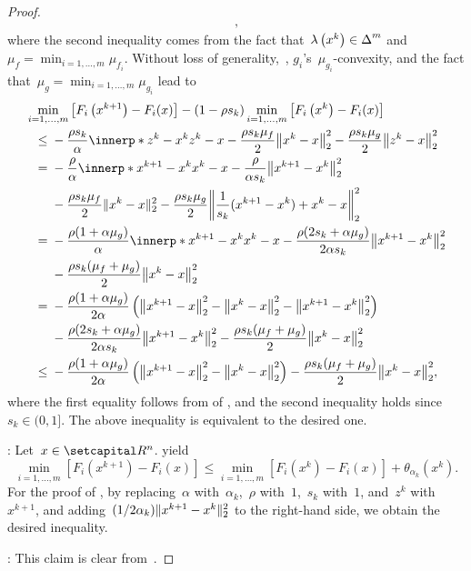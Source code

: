 \documentclass[../../main]{subfiles}
\begin{document}
\begin{proof}
\begin{align}
    ,\end{align} 
    where the second inequality comes from the fact that~$\lambda\left(x^k\right) \in \operatorname{\Delta}^m$ and~$\mu_f = \min_{i = 1, \dots, m} \mu_{f_i}$.
    Without loss of generality,~, $g_i$'s~$\mu_{g_i}$-convexity, and the fact that~$\mu_g = \min_{i = 1, \dots, m} \mu_{g_i}$ lead to
    \begin{align}
        \MoveEqLeft \min_{i = 1, \dots, m} \left[F_i\left(x^{k + 1}\right) - F_i(x)\right] - (1 - \rho s_k) \min_{i = 1, \dots, m} \left[F_i\left(x^k\right) - F_i(x)\right] \\
        \le{}& - \frac{\rho s_k}{\alpha} \innerp*{z^k - x^k}{z^k - x} - \frac{\rho s_k \mu_f}{2} \norm*{x^k - x}_2^2 - \frac{\rho s_k \mu_g}{2} \norm*{z^k - x}_2^2 \\
        ={}& - \frac{\rho}{\alpha} \innerp*{x^{k + 1} - x^k}{x^k - x} - \frac{\rho}{\alpha s_k} \norm*{x^{k + 1} - x^k}_2^2 \\
             &- \frac{\rho s_k \mu_f}{2} \norm{x^k - x}_2^2 - \frac{\rho s_k \mu_g}{2} \norm*{\frac{1}{s_k} (x^{k + 1} - x^k) + x^k - x}_2^2 \\
        ={}& - \frac{\rho (1 + \alpha \mu_g)}{\alpha} \innerp*{x^{k + 1} - x^k}{x^k - x} - \frac{\rho (2 s_k + \alpha \mu_g)}{2 \alpha s_k} \norm*{x^{k + 1} - x^k}_2^2  \\
             &- \frac{\rho s_k (\mu_f + \mu_g)}{2} \norm*{x^k - x}_2^2 \\
        ={}& - \frac{\rho (1 + \alpha \mu_g)}{2 \alpha} \left( \norm*{x^{k + 1} - x}_2^2 - \norm*{x^k - x}_2^2 - \norm*{x^{k + 1} - x^k}_2^2 \right) \\
           &- \frac{\rho (2 s_k + \alpha \mu_g)}{2 \alpha s_k} \norm*{x^{k + 1} - x^k}_2^2 - \frac{\rho s_k (\mu_f + \mu_g)}{2} \norm*{x^k - x}_2^2 \\
        \le{}& - \frac{\rho (1 + \alpha \mu_g)}{2 \alpha} \left( \norm*{x^{k + 1} - x}_2^2 - \norm*{x^k - x}_2^2 \right) - \frac{\rho s_k (\mu_f + \mu_g)}{2} \norm*{x^k - x}_2^2
    ,\end{align}
    where the first equality follows from  of , and the second inequality holds since~$s_k \in (0, 1]$.
    The above inequality is equivalent to the desired one.

    :
    Let~$x \in \setR^n$.
     yield
    \begin{equation}
        \min_{i = 1, \dots, m} \left[F_i\left(x^{k + 1}\right) - F_i(x)\right] \le \min_{i = 1, \dots, m} \left[F_i\left(x^k\right) - F_i(x)\right] + \theta_{\alpha_k}\left(x^k\right)
    .\end{equation}
    For the proof of , by replacing~$\alpha$ with~$\alpha_k$,~$\rho$ with~$1$,~$s_k$ with~$1$, and~$z^k$ with~$x^{k + 1}$, and adding~$(1 / 2 \alpha_k) \lVert x^{k + 1} - x^k\rVert_2^2$ to the right-hand side, we obtain the desired inequality.

    :
    This claim is clear from~.
\end{proof}
\end{document}
